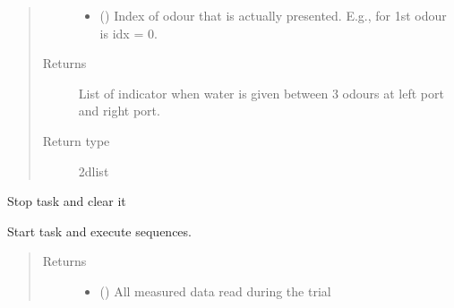 \documentclass[letterpaper,10pt,english]{sphinxmanual}
\begin{document}
\begin{fulllineitems}
\begin{fulllineitems}
\begin{quote}
\begin{description}
\begin{itemize}
\item {} 
\sphinxAtStartPar
{} () \textendash{} Index of odour that is actually presented. E.g., for 1st odour is
idx = 0.

\end{itemize}

\item[{Returns}] \leavevmode
\sphinxAtStartPar
{} \textendash{} List of indicator when water is given between 3 odours at left port
and right port.

\item[{Return type}] \leavevmode
\sphinxAtStartPar
2d\sphinxhyphen{}list

\end{description}\end{quote}

\end{fulllineitems}


\begin{fulllineitems}
\label{\detokenize{NoSeMazeController/daqface:daqface.DAQ.DoAiConcatenatedPretrainingMultiTask.ClearTasks}}
\pysigstartsignatures
{}
\pysigstopsignatures
\sphinxAtStartPar
Stop task and clear it

\end{fulllineitems}


\begin{fulllineitems}
\label{\detokenize{NoSeMazeController/daqface:daqface.DAQ.DoAiConcatenatedPretrainingMultiTask.DoTask}}
\pysigstartsignatures
{}
\pysigstopsignatures
\sphinxAtStartPar
Start task and execute sequences.
\begin{quote}\begin{description}
\item[{Returns}] \leavevmode
\sphinxAtStartPar
\begin{itemize}
\item {} 
\sphinxAtStartPar
{} () \textendash{} All measured data read during the trial


\end{itemize}
\end{description}
\end{quote}
\end{fulllineitems}
\end{fulllineitems}
\end{document}
